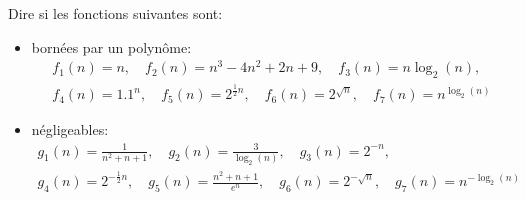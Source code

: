 \begin{td-exo}[] %
	Dire si les fonctions suivantes sont:
	\begin{itemize}
		\item bornées par un polynôme:
		\begin{gather*}
			f_1(n) = n, \quad f_2(n) = n^3 - 4n^2 + 2n + 9, \quad f_3(n) = n \log_2(n), \\
			f_4(n) = {1.1}^n, \quad f_5(n) = 2^{\frac12n}, \quad f_6(n) = 2^{\sqrt{n}}, \quad
			f_7(n) = n^{\log_2(n)}
		\end{gather*}
		\item négligeables:
		\begin{gather*}
			g_1(n) = \frac{1}{n^2+n+1}, \quad g_2(n) = \frac{3}{\log_2(n)}, \quad g_3(n) = 2^{-n}, \\
			g_4(n) = 2^{-\frac12n}, \quad g_5(n) = \frac{n^2+n+1}{e^n}, \quad g_6(n) = 2^{-\sqrt{n}}, \quad
			g_7(n) = n^{-\log_2(n)}
		\end{gather*}
	\end{itemize}
\end{td-exo}

